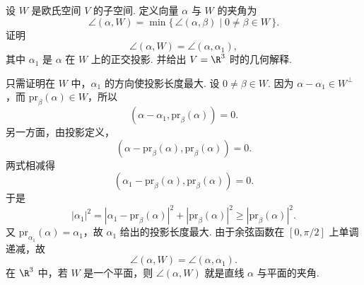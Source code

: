 \begin{problem}

	设 $W$ 是欧氏空间 $V$ 的子空间. 定义向量 $\alpha$ 与 $W$ 的夹角为
	\[
	\angle(\alpha,W)=\min\{\,\angle(\alpha,\beta)\mid 0\ne\beta\in W\,\}.
	\]
	证明
	\[
	\angle(\alpha,W)=\angle(\alpha,\alpha_1),
	\]
	其中 $\alpha_1$ 是 $\alpha$ 在 $W$ 上的正交投影. 并给出 $V=\R^3$ 时的几何解释.
\end{problem}
\begin{solution}
	只需证明在 $W$ 中，$\alpha_1$ 的方向使投影长度最大. 设 $0\ne\beta\in W$. 因为 $\alpha-\alpha_1\in W^\perp$，而 $\mathrm{pr}_{\beta}(\alpha)\in W$，所以
	\[
	(\alpha-\alpha_1,\mathrm{pr}_{\beta}(\alpha))=0.
	\]
	另一方面，由投影定义，
	\[
	(\alpha-\mathrm{pr}_{\beta}(\alpha),\mathrm{pr}_{\beta}(\alpha))=0.
	\]
	两式相减得
	\[
	(\alpha_1-\mathrm{pr}_{\beta}(\alpha),\mathrm{pr}_{\beta}(\alpha))=0.
	\]
	于是
	\[
	|\alpha_1|^2=|\alpha_1-\mathrm{pr}_{\beta}(\alpha)|^2+|\mathrm{pr}_{\beta}(\alpha)|^2
	\geqslant |\mathrm{pr}_{\beta}(\alpha)|^2.
	\]
	又 $\mathrm{pr}_{\alpha_1}(\alpha)=\alpha_1$，故 $\alpha_1$ 给出的投影长度最大. 由于余弦函数在 $[0,\pi/2]$ 上单调递减，故
	\[
	\angle(\alpha,W)=\angle(\alpha,\alpha_1).
	\]
	在 $\R^3$ 中，若 $W$ 是一个平面，则 $\angle(\alpha,W)$ 就是直线 $\alpha$ 与平面的夹角.
\end{solution}

